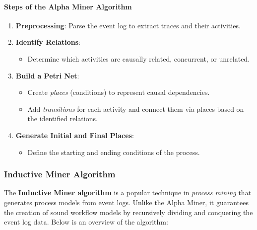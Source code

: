 \paragraph{Steps of the Alpha Miner Algorithm}
\begin{enumerate}
    \item \textbf{Preprocessing}: Parse the event log to extract traces and their activities.
    \item \textbf{Identify Relations}:
    \begin{itemize}
        \item Determine which activities are causally related, concurrent, or unrelated.
    \end{itemize}
    \item \textbf{Build a Petri Net}:
    \begin{itemize}
        \item Create \textit{places} (conditions) to represent causal dependencies.
        \item Add \textit{transitions} for each activity and connect them via places based on the identified relations.
    \end{itemize}
    \item \textbf{Generate Initial and Final Places}:
    \begin{itemize}
        \item Define the starting and ending conditions of the process.
    \end{itemize}
\end{enumerate}






\subsubsection{Inductive Miner Algorithm}

The \textbf{Inductive Miner algorithm} is a popular technique in \textit{process mining} that generates process models from event logs. Unlike the Alpha Miner, it guarantees the creation of sound workflow models by recursively dividing and conquering the event log data. Below is an overview of the algorithm:

